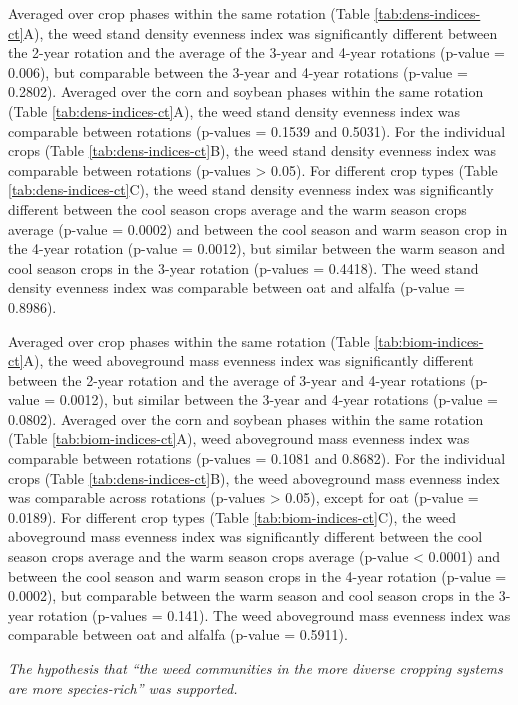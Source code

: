 \documentclass[
]{article}
\begin{document}
Averaged over crop phases within the same rotation (Table \ref{tab:dens-indices-ct}A), the weed stand density evenness index was significantly different between the 2-year rotation and the average of the 3-year and 4-year rotations (p-value = 0.006), but comparable between the 3-year and 4-year rotations (p-value = 0.2802). Averaged over the corn and soybean phases within the same rotation (Table \ref{tab:dens-indices-ct}A), the weed stand density evenness index was comparable between rotations (p-values = 0.1539 and 0.5031). For the individual crops (Table \ref{tab:dens-indices-ct}B), the weed stand density evenness index was comparable between rotations (p-values \textgreater{} 0.05). For different crop types (Table \ref{tab:dens-indices-ct}C), the weed stand density evenness index was significantly different between the cool season crops average and the warm season crops average (p-value = 0.0002) and between the cool season and warm season crop in the 4-year rotation (p-value = 0.0012), but similar between the warm season and cool season crops in the 3-year rotation (p-values = 0.4418). The weed stand density evenness index was comparable between oat and alfalfa (p-value = 0.8986).

Averaged over crop phases within the same rotation (Table \ref{tab:biom-indices-ct}A), the weed aboveground mass evenness index was significantly different between the 2-year rotation and the average of 3-year and 4-year rotations (p-value = 0.0012), but similar between the 3-year and 4-year rotations (p-value = 0.0802). Averaged over the corn and soybean phases within the same rotation (Table \ref{tab:biom-indices-ct}A), weed aboveground mass evenness index was comparable between rotations (p-values = 0.1081 and 0.8682). For the individual crops (Table \ref{tab:dens-indices-ct}B), the weed aboveground mass evenness index was comparable across rotations (p-values \textgreater{} 0.05), except for oat (p-value = 0.0189). For different crop types (Table \ref{tab:biom-indices-ct}C), the weed aboveground mass evenness index was significantly different between the cool season crops average and the warm season crops average (p-value \textless{} 0.0001) and between the cool season and warm season crops in the 4-year rotation (p-value = 0.0002), but comparable between the warm season and cool season crops in the 3-year rotation (p-values = 0.141). The weed aboveground mass evenness index was comparable between oat and alfalfa (p-value = 0.5911).

\emph{The hypothesis that ``the weed communities in the more diverse cropping systems are more species-rich'' was supported.}
\end{document}
